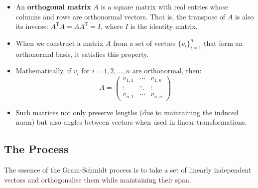 \begin{itemize}
    \item An \textbf{orthogonal matrix} $A$ is a square matrix with real entries whose columns and rows are orthonormal vectors. That is, the transpose of $A$ is also its inverse: $A^\mathsf{T}A = AA^\mathsf{T} = I$, where $I$ is the identity matrix. 
    \item When we construct a matrix $A$ from a set of vectors $\{v_i\}_{i=1}^n$ that form an orthonormal basis, it satisfies this property. 
    \item Mathematically, if $v_i$ for $i = 1, 2, \ldots, n$ are orthonormal, then:
    \begin{equation}
        A = \begin{pmatrix}
            v_{1,1} & \cdots & v_{1,n} \\
            \vdots & \ddots & \vdots \\
            v_{n,1} & \cdots & v_{n,n}
        \end{pmatrix}
    \end{equation}
    \item Such matrices not only preserve lengths (due to maintaining the induced norm) but also angles between vectors when used in linear transformations.
\end{itemize}

\subsection*{The Process}

The essence of the Gram-Schmidt process is to take a set of linearly independent vectors and orthogonalise them while maintaining their span.

